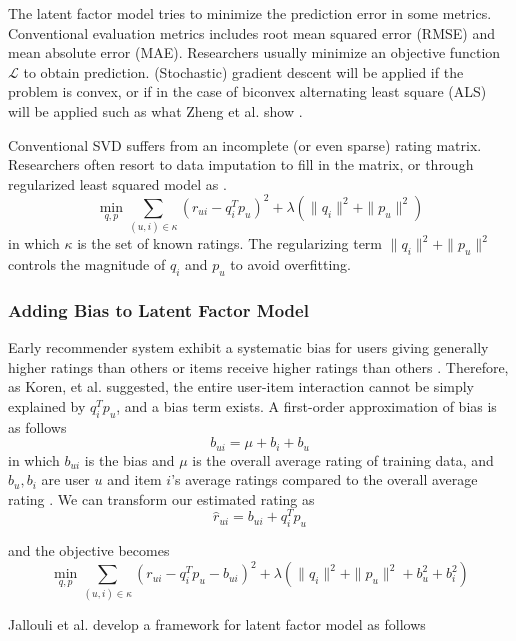 \documentclass[letter paper, 11pt]{article}
\begin{document}
	The latent factor model tries to minimize the prediction error in some metrics. Conventional evaluation metrics includes root mean squared error (RMSE) and mean absolute error (MAE). Researchers usually minimize an objective function $\mathcal{L}$ to obtain prediction. (Stochastic) gradient descent will be applied if the problem is convex, or if in the case of biconvex alternating least square (ALS) will be applied such as what Zheng et al. show \cite{RSVD}.
	
	
	Conventional SVD suffers from an incomplete (or even sparse) rating matrix. Researchers often resort to data imputation to fill in the matrix, or through regularized least squared model as \cite{MFinRS}.
	\begin{equation}
		\min_{q, p} \sum_{(u, i) \in \kappa} (r_{ui} - q_i^T p_u)^2 + \lambda(\|q_i\|^2 + \|p_u\|^2)
	\end{equation}
	in which $\kappa$ is the set of known ratings. The regularizing term $\|q_i\|^2 + \|p_u\|^2$ controls the magnitude of $q_i$ and $p_u$ to avoid overfitting.
	
	 
	\subsubsection{Adding Bias to Latent Factor Model}
	Early recommender system exhibit a systematic bias for users giving generally higher ratings than others or items receive higher ratings than others \cite{MFinRS}. Therefore, as Koren, et al. suggested, the entire user-item interaction cannot be simply explained by $q_i^T  p_u$, and a bias term exists. A first-order approximation of bias is as follows \cite{MFinRS}
	\begin{equation}
		b_{ui} = \mu + b_i + b_u
	\end{equation}
	in which $b_{ui}$ is the bias and $\mu$ is the overall average rating of training data, and $b_u, b_i$ are user $u$ and item $i$'s average ratings compared to the overall average rating \cite{MFinRS}. We can transform our estimated rating as 
	\begin{equation}
		\hat{r}_{ui} = b_{ui} + q_i^T  p_u 
	\end{equation}
	
	and the objective becomes
	\begin{equation}
		\min_{q, p} \sum_{(u, i) \in \kappa} (r_{ui} - q_i^T p_u - b_{ui})^2 + \lambda(\|q_i\|^2 + \|p_u\|^2 + b_u^2 + b_i^2)
	\end{equation}
	
	Jallouli et al. develop a framework for latent factor model \cite{latentFactor-RS} as follows
	
\end{document}
